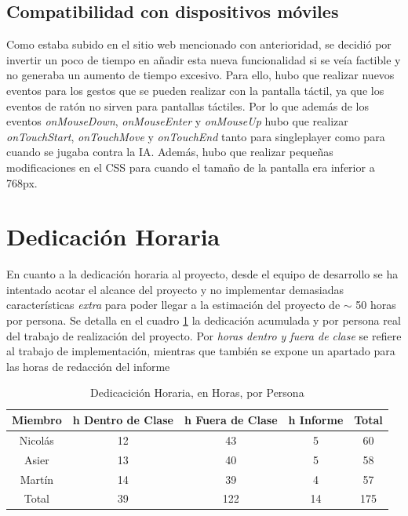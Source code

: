 \documentclass[12pt,epsf,titlepage,a4paper]{article}
\begin{document}
\subsection{Compatibilidad con dispositivos móviles}

Como estaba subido en el sitio web mencionado con anterioridad, se decidió por invertir un poco de tiempo en añadir esta nueva funcionalidad si se veía factible y no generaba un aumento de tiempo excesivo. Para ello, hubo que realizar nuevos eventos para los gestos que se pueden realizar con la pantalla táctil, ya que los eventos de ratón no sirven para pantallas táctiles. Por lo que además de los eventos \emph{onMouseDown}, \emph{onMouseEnter} y \emph{onMouseUp} hubo que realizar \emph{onTouchStart}, \emph{onTouchMove} y \emph{onTouchEnd} tanto para singleplayer como para cuando se jugaba contra la IA. Además, hubo que realizar pequeñas modificaciones en el CSS para cuando el tamaño de la pantalla era inferior a 768px.

\pagebreak

\section{Dedicación Horaria}

En cuanto a la dedicación horaria al proyecto, desde el equipo de desarrollo se ha intentado acotar el alcance del proyecto y no implementar demasiadas características \emph{extra} para poder llegar a la estimación del proyecto de $\sim$ 50 horas por persona. Se detalla en el cuadro \ref{tab:dedic} la dedicación acumulada y por persona real del trabajo de realización del proyecto. Por \emph{horas dentro y fuera de clase} se refiere al trabajo de implementación, mientras que también se expone un apartado para las horas de redacción del informe

\begin{table}[h!]
\centering
\begin{tabular}{|c||c|c|c||c|}
     \hline
       Miembro & h Dentro de Clase & h Fuera de Clase & h Informe & Total \\ [0.5ex] 
        \hline\hline
        Nicolás & 12 & 43 & 5 & 60 \\
        Asier & 13 & 40 & 5 & 58 \\
        Martín & 14  & 39 & 4 & 57 \\
        \hline \hline
        Total  & 39  & 122 & 14 & 175 \\ [1ex] 
        \hline
    \end{tabular}
    \caption{Dedicacición Horaria, en Horas, por Persona}
    \label{tab:dedic}
\end{table}
\end{document}
